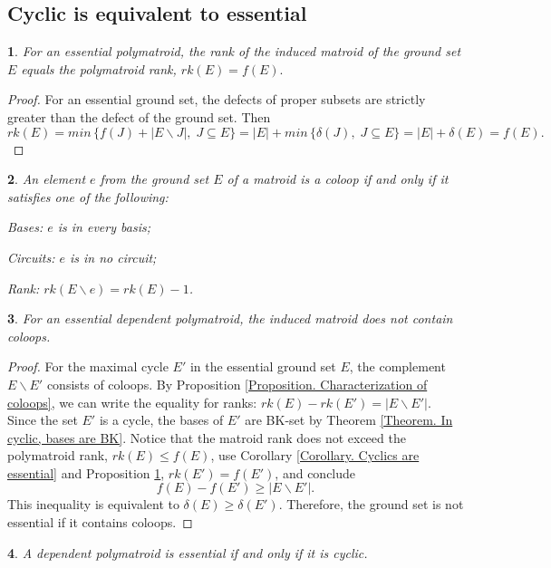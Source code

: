 \documentclass[11pt]{article}
\theoremstyle{plain}
\newtheorem{thm}{\protect\theoremname}[section]
\theoremstyle{definition}
\theoremstyle{remark}
\theoremstyle{plain}
\newtheorem{lem}[thm]{\protect\lemmaname}
\theoremstyle{plain}
\newtheorem{prop}[thm]{\protect\propositionname}
\theoremstyle{plain}
\theoremstyle{definition}
\providecommand{\lemmaname}{Lemma}
\providecommand{\propositionname}{Proposition}
\providecommand{\theoremname}{Theorem}
\begin{document}
\subsection{Cyclic is equivalent to essential}
\begin{prop}
\label{Proposition. Essential, rk(E)=00003Df(E)}For an essential
polymatroid, the rank of the induced matroid of the ground set $E$
equals the polymatroid rank, $rk(E)=f(E).$
\end{prop}

\begin{proof}
For an essential ground set, the defects of proper subsets are strictly
greater than the defect of the ground set. Then
\[
rk(E)=min\,\{f(J)+|E\backslash J|,\;J\subseteq E\}=|E|+min\,\{\delta(J),\;J\subseteq E\}=|E|+\delta(E)=f(E).
\]
\end{proof}
\begin{prop}
\textup{\label{Proposition. Characterization of coloops}\cite{white_theory_1986}
}An element $e$ from the ground set $E$ of a matroid is a coloop
if and only if it satisfies one of the following:

Bases: $e$ is in every basis;

Circuits: $e$ is in no circuit;

Rank: $rk(E\backslash e)=rk(E)-1$.
\end{prop}

\begin{lem}
\label{Lemma. An essential dependent polymatroid doesn't contain coloops.}For
an essential dependent polymatroid, the induced matroid does not contain
coloops.
\end{lem}

\begin{proof}
For the maximal cycle $E'$ in the essential ground set $E$, the
complement $E\backslash E'$ consists of coloops. By Proposition \ref{Proposition. Characterization of coloops},
we can write the equality for ranks: $rk(E)-rk(E')=|E\backslash E'|$.
Since the set $E'$ is a cycle, the bases of $E'$ are BK-set by Theorem
\ref{Theorem. In cyclic, bases are BK}. Notice that the matroid rank
does not exceed the polymatroid rank, $rk(E)\leq f(E)$, use Corollary
\ref{Corollary. Cyclics are essential} and Proposition \ref{Proposition. Essential, rk(E)=00003Df(E)},
$rk(E')=f(E')$, and conclude
\[
f(E)-f(E')\geq|E\backslash E'|.
\]
This inequality is equivalent to $\delta(E)\geq\delta(E')$. Therefore,
the ground set is not essential if it contains coloops.
\end{proof}
\begin{thm}
\label{Theorem. Cyclic=00003Dessential}A dependent polymatroid is
essential if and only if it is cyclic.
\end{thm}
\end{document}
